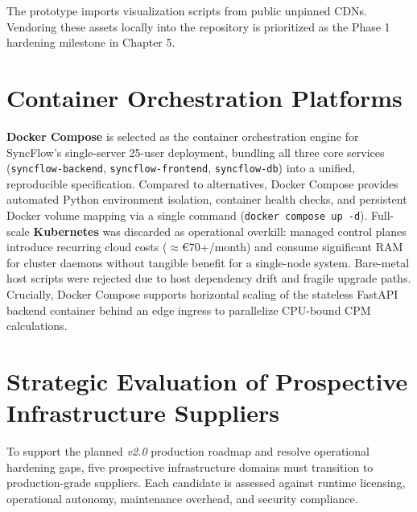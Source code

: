 The prototype imports visualization scripts from public unpinned CDNs. Vendoring these assets locally into the repository is prioritized as the Phase 1 hardening milestone in Chapter 5. 

\vspace{4mm}

\section{Container Orchestration Platforms}
\textbf{Docker Compose} is selected as the container orchestration engine for SyncFlow's single-server 25-user deployment, bundling all three core services (\texttt{syncflow-backend}, \texttt{syncflow-frontend}, \texttt{syncflow-db}) into a unified, reproducible specification. Compared to alternatives, Docker Compose provides automated Python environment isolation, container health checks, and persistent Docker volume mapping via a single command (\texttt{docker compose up -d}). Full-scale \textbf{Kubernetes} was discarded as operational overkill: managed control planes introduce recurring cloud costs ($\approx$€70+/month) and consume significant RAM for cluster daemons without tangible benefit for a single-node system. Bare-metal host scripts were rejected due to host dependency drift and fragile upgrade paths. Crucially, Docker Compose supports horizontal scaling of the stateless FastAPI backend container behind an edge ingress to parallelize CPU-bound CPM calculations.

\newpage

\section{Strategic Evaluation of Prospective Infrastructure Suppliers}
To support the planned \textit{v2.0} production roadmap and resolve operational hardening gaps, five prospective infrastructure domains must transition to production-grade suppliers. Each candidate is assessed against runtime licensing, operational autonomy, maintenance overhead, and security compliance.

